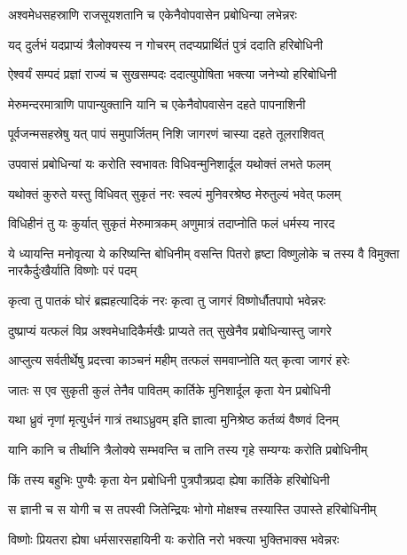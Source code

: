 \twolineshloka
{अश्वमेधसहस्राणि राजसूयशतानि च}
{एकेनैवोपवासेन प्रबोधिन्या लभेन्नरः}%

\twolineshloka
{यद् दुर्लभं यदप्राप्यं त्रैलोक्यस्य न गोचरम्}
{तदप्यप्रार्थितं पुत्रं ददाति हरिबोधिनी}%

\twolineshloka
{ऐश्वर्यं सम्पदं प्रज्ञां राज्यं च सुखसम्पदः}
{ददात्युपोषिता भक्त्या जनेभ्यो हरिबोधिनी}%

\twolineshloka
{मेरुमन्दरमात्राणि पापान्युक्तानि यानि च}
{एकेनैवोपवासेन दहते पापनाशिनी}%

\twolineshloka
{पूर्वजन्मसहस्रेषु यत् पापं समुपार्जितम्}
{निशि जागरणं चास्या दहते तूलराशिवत्}%

\twolineshloka
{उपवासं प्रबोधिन्यां यः करोति स्वभावतः}
{विधिवन्मुनिशार्दूल यथोक्तं लभते फलम्}%

\twolineshloka
{यथोक्तं कुरुते यस्तु विधिवत् सुकृतं नरः}
{स्वल्पं मुनिवरश्रेष्ठ मेरुतुल्यं भवेत् फलम्}%

\twolineshloka
{विधिहीनं तु यः कुर्यात् सुकृतं मेरुमात्रकम्}
{अणुमात्रं तदाप्नोति फलं धर्मस्य नारद}%

\threelineshloka
{ये ध्यायन्ति मनोवृत्या ये करिष्यन्ति बोधिनीम्}
{वसन्ति पितरो हृष्टा विष्णुलोके च तस्य वै}%
{विमुक्ता नारकैर्दुःखैर्याति विष्णोः परं पदम्}

\twolineshloka
{कृत्वा तु पातकं घोरं ब्रह्महत्यादिकं नरः}%
{कृत्वा तु जागरं विष्णोर्धौतपापो भवेन्नरः}

\twolineshloka
{दुष्प्राप्यं यत्फलं विप्र अश्वमेधादिकैर्मखैः}%
{प्राप्यते तत् सुखेनैव प्रबोधिन्यास्तु जागरे}

\twolineshloka
{आप्लुत्य सर्वतीर्थेषु प्रदत्त्वा काञ्चनं महीम्}%
{तत्फलं समवाप्नोति यत् कृत्वा जागरं हरेः}

\twolineshloka
{जातः स एव सुकृती कुलं तेनैव पावितम्}%
{कार्तिके मुनिशार्दूल कृता येन प्रबोधिनी}

\twolineshloka
{यथा ध्रुवं नृणां मृत्युर्धनं गात्रं तथाऽध्रुवम्}%
{इति ज्ञात्वा मुनिश्रेष्ठ कर्तव्यं वैष्णवं दिनम्}

\twolineshloka
{यानि कानि च तीर्थानि त्रैलोक्ये सम्भवन्ति च}%
{तानि तस्य गृहे सम्यग्यः करोति प्रबोधिनीम्}

\twolineshloka
{किं तस्य बहुभिः पुण्यैः कृता येन प्रबोधिनी}%
{पुत्रपौत्रप्रदा ह्येषा कार्तिके हरिबोधिनी}

\twolineshloka
{स ज्ञानी च स योगी च स तपस्वी जितेन्द्रियः}%
{भोगो मोक्षश्च तस्यास्ति उपास्ते हरिबोधिनीम्}

\twolineshloka
{विष्णोः प्रियतरा ह्येषा धर्मसारसहायिनी}%
{यः करोति नरो भक्त्या भुक्तिभाक्स भवेन्नरः}

